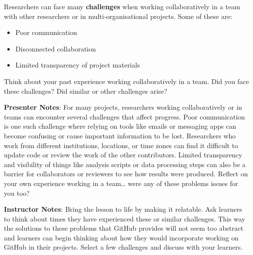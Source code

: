 \documentclass[
  letterpaper,
  DIV=11,
  numbers=noendperiod]{scrartcl}
\providecommand{\tightlist}{%
  \setlength{\itemsep}{0pt}\setlength{\parskip}{0pt}}
\begin{document}
Researchers can face many \textbf{challenges} when working
collaboratively in a team with other researchers or in
multi-organisational projects. Some of these are:

\begin{itemize}
\tightlist
\item
  Poor communication
\item
  Disconnected collaboration
\item
  Limited transparency of project materials
\end{itemize}

\begin{tcolorbox}[enhanced jigsaw, colbacktitle=quarto-callout-tip-color!10!white, opacityback=0, leftrule=.75mm, colback=white, opacitybacktitle=0.6, colframe=quarto-callout-tip-color-frame, title=\textcolor{quarto-callout-tip-color}{\faLightbulb}\hspace{0.5em}{Sound familiar?}, left=2mm, titlerule=0mm, toptitle=1mm, breakable, bottomtitle=1mm, arc=.35mm, rightrule=.15mm, bottomrule=.15mm, toprule=.15mm, coltitle=black]

Think about your past experience working collaboratively in a team. Did
you face these challenges? Did similar or other challenges arise?

\end{tcolorbox}

\textbf{Presenter Notes}: For many projects, researchers working
collaboratively or in teams can encounter several challenges that affect
progress. Poor communication is one such challenge where relying on
tools like emails or messaging apps can become confusing or cause
important information to be lost. Researchers who work from different
institutions, locations, or time zones can find it difficult to update
code or review the work of the other contributors. Limited transparency
and visibility of things like analysis scripts or data processing steps
can also be a barrier for collaborators or reviewers to see how results
were produced. Reflect on your own experience working in a team\ldots{}
were any of these problems issues for you too?

\textbf{Instructor Notes}: Bring the lesson to life by making it
relatable. Ask learners to think about times they have experienced these
or similar challenges. This way the solutions to these problems that
GitHub provides will not seem too abstract and learners can begin
thinking about how they would incorporate working on GitHub in their
projects. Select a few challenges and discuss with your learners.
\end{document}
